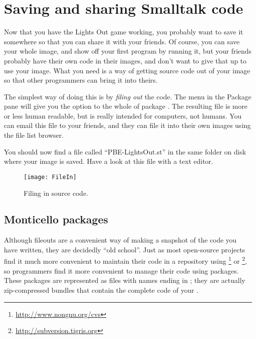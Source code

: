 \documentclass[a4paper,10pt,twoside]{book}
\begin{document}
{%
\section{Saving and sharing Smalltalk code}

Now that you have the Lights Out game working, you probably want to save it somewhere so that you can share it with your friends. Of course, you can save your whole \pharo image, and show off your first program by running it, but your friends probably have their own code in their images, and don't want to give that up to use your image.
What you need is a way of getting source code out of your \pharo image so that other programmers can bring it into theirs.

The simplest way of doing this is by \emph{filing out} the code.  The \actclick menu in the Package pane will give you the option to  the whole of package .
The resulting file is more or less human readable, but is really intended for computers, not humans.
You can email this file to your friends, and they can file it into their own \pharo images using the file list browser.

You should now find a file called ``PBE-LightsOut.st'' in the same folder on disk where your image is saved.
Have a look at this file with a text editor.


\begin{figure}[ht]
\centerline {\texttt{[image: FileIn]}}
\caption{Filing in \pharo source code.
}
\end{figure}

\subsection{Monticello packages}
Although fileouts are a convenient way of making a snapshot of the code you have written, they are decidedly ``old school''.
Just as most open-source projects find it much more convenient to maintain their code in a repository using \footnote{\url{http://www.nongnu.org/cvs}} or \footnote{\url{http://subversion.tigris.org}},
so \pharo programmers find it more convenient to manage their code using  packages. 
These packages are represented as files with names ending in ; they are actually zip-compressed bundles that contain the complete code of your .

}
\end{document}
